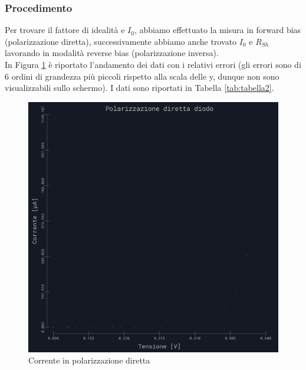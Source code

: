 \documentclass{article}
\begin{document}
\subsubsection{Procedimento}

Per trovare il fattore di idealità e $I_0$, abbiamo effettuato la misura in forward bias (polarizzazione diretta), successivamente abbiamo anche trovato $I_0$  e  $R_{Sh}$ lavorando in modalità reverse bias (polarizzazione inversa).
\\
In Figura \ref{grafico:2} è riportato l'andamento dei dati con i relativi errori (gli errori sono di 6 ordini di grandezza più piccoli rispetto alla scala delle y, dunque non sono visualizzabili sullo schermo). I dati sono riportati in Tabella \ref{tab:tabella2}. 
\begin{figure}[h]
    \centering
    \includegraphics[width=.65\linewidth]{../images/grafico2.png} %
    \caption{Corrente in polarizzazione diretta}
    \label{grafico:2}
\end{figure}

\newpage
\end{document}

